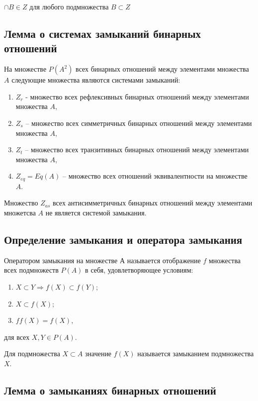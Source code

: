 \documentclass[bachelor, och, labwork]{shiza}
\begin{document}
	$\cap B \in Z $ для любого подмножества $B \subset Z $
	
	
	\subsection{Лемма о системах замыканий бинарных отношений}
	  На множестве $P(A^2)$ всех бинарных отношений между элементами множества $A$ следующие множества являются системами замыканий:
	
	\begin{enumerate}
		\item $Z_r$ - множество всех рефлексивных бинарных отношений между элементами множества $A$,
		\item $Z_s$ – множество всех симметричных бинарных отношений между элементами множества $A$,
		\item $Z_t$ – множество всех транзитивных бинарных отношений между элементами множества $A$,
		\item $Z_{eq} = Eq(A)$ – множество всех отношений эквивалентности на множестве $A$.
	\end{enumerate}

	Множество $Z_{as}$ всех антисимметричных бинарных отношений между элементами множетсва $A$ не является системой замыкания.
	
	\subsection{Определение замыкания и оператора замыкания}

	$\textit{Оператором замыкания}$ на множестве $А$ называется отображение $f$ множества всех подмножеств $P(A)$ в себя, удовлетворяющее условиям:

	\begin{enumerate}
		\item $X \subset Y \Rightarrow f(X) \subset f(Y)$;
		\item $X \subset f(X)$;
		\item $ff(X) = f(X)$,
	\end{enumerate}

	для всех $X,Y \in P(A)$.
	
	Для подмножества $X \subset A$ значение $f(X)$ называется $\textit{замыканием}$ подмножества $X$.

	\subsection{Лемма о замыканиях бинарных отношений}
	
\end{document}
